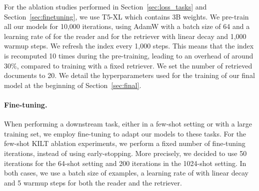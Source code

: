 \documentclass[10pt]{article} \usepackage[preprint]{tmlr}
\begin{document}
For the ablation studies performed in Section~\ref{sec:loss_tasks} and Section~\ref{sec:finetuning}, we use T5-XL which contains 3B weights.
We pre-train all our models for 10,000 iterations, using AdamW with a batch size of 64 and a learning rate of  for the reader and  for the retriever with linear decay and 1,000 warmup steps.
We refresh the index every 1,000 steps.
This means that the index is recomputed 10 times during the pre-training, leading to an overhead of around 30\%, compared to training with a fixed retriever.
We set the number of retrieved documents to 20.
We detail the hyperparameters used for the training of our final model at the beginning of Section~\ref{sec:final}.

\paragraph{Fine-tuning.}
When performing a downstream task, either in a few-shot setting or with a large training set, we employ fine-tuning to adapt our models to these tasks.
For the few-shot KILT ablation experiments, we perform a fixed number of fine-tuning iterations, instead of using early-stopping.
More precisely, we decided to use 50 iterations for the 64-shot setting and 200 iterations in the 1024-shot setting.
In both cases, we use a batch size of  examples, a learning rate of  with linear decay and 5 warmup steps for both the reader and the retriever.
\end{document}
